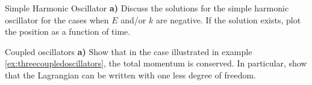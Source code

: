 \begin{problem}{Simple Harmonic Oscillator}
\textbf{a)} Discuss the solutions for the simple harmonic oscillator for the cases when $E$ and/or $k$ are negative. If the solution exists, plot the position as a function of time.
\end{problem}

\begin{problem}{Coupled oscillators}
\textbf{a)} Show that in the case illustrated in example \ref{ex:threecoupledoscillators}, the total momentum is conserved. In particular, show that the Lagrangian can be written with one less degree of freedom.
\end{problem}
